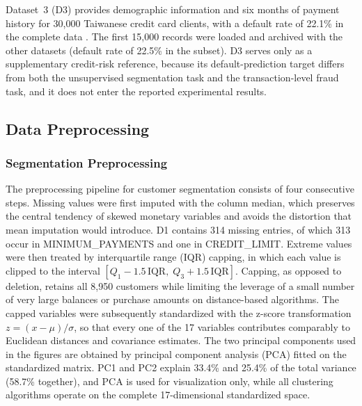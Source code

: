 \documentclass[conference]{IEEEtran}
\begin{document}
Dataset~3 (D3) provides demographic information and six months of payment history for 30,000 Taiwanese credit card clients, with a default rate of 22.1\% in the complete data \cite{uci_default}. The first 15,000 records were loaded and archived with the other datasets (default rate of 22.5\% in the subset). D3 serves only as a supplementary credit-risk reference, because its default-prediction target differs from both the unsupervised segmentation task and the transaction-level fraud task, and it does not enter the reported experimental results.

\subsection{Data Preprocessing}

\subsubsection{Segmentation Preprocessing}
The preprocessing pipeline for customer segmentation consists of four consecutive steps. Missing values were first imputed with the column median, which preserves the central tendency of skewed monetary variables and avoids the distortion that mean imputation would introduce. D1 contains 314 missing entries, of which 313 occur in MINIMUM\_PAYMENTS and one in CREDIT\_LIMIT. Extreme values were then treated by interquartile range (IQR) capping, in which each value is clipped to the interval $[Q_1 - 1.5\,\mathrm{IQR},\; Q_3 + 1.5\,\mathrm{IQR}]$. Capping, as opposed to deletion, retains all 8,950 customers while limiting the leverage of a small number of very large balances or purchase amounts on distance-based algorithms. The capped variables were subsequently standardized with the z-score transformation $z = (x - \mu)/\sigma$, so that every one of the 17 variables contributes comparably to Euclidean distances and covariance estimates. The two principal components used in the figures are obtained by principal component analysis (PCA) fitted on the standardized matrix. PC1 and PC2 explain 33.4\% and 25.4\% of the total variance (58.7\% together), and PCA is used for visualization only, while all clustering algorithms operate on the complete 17-dimensional standardized space.
\end{document}
